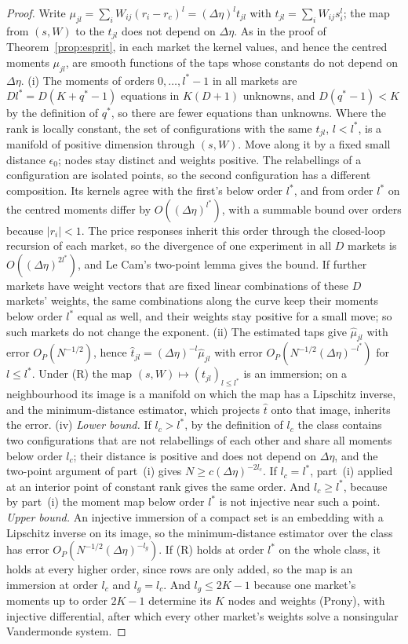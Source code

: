 \documentclass[12pt]{article}
\theoremstyle{definition}
\theoremstyle{remark}
\begin{document}
\begin{proof}
Write $\mu_{jl}=\sum_iW_{ij}(r_i-r_c)^l=(\Delta\eta)^lt_{jl}$ with $t_{jl}=\sum_iW_{ij}s_i^l$; the map from $(s,W)$ to the $t_{jl}$ does not depend on $\Delta\eta$. As in the proof of Theorem~\ref{prop:esprit}, in each market the kernel values, and hence the centred moments $\mu_{jl}$, are smooth functions of the taps whose constants do not depend on $\Delta\eta$.
(i) The moments of orders $0,\ldots,l^*-1$ in all markets are $Dl^*=D(K+q^*-1)$ equations in $K(D+1)$ unknowns, and $D(q^*-1)<K$ by the definition of $q^*$, so there are fewer equations than unknowns. Where the rank is locally constant, the set of configurations with the same $t_{jl}$, $l<l^*$, is a manifold of positive dimension through $(s,W)$. Move along it by a fixed small distance $\epsilon_0$; nodes stay distinct and weights positive. The relabellings of a configuration are isolated points, so the second configuration has a different composition. Its kernels agree with the first's below order $l^*$, and from order $l^*$ on the centred moments differ by $O((\Delta\eta)^{l^*})$, with a summable bound over orders because $|r_i|<1$. The price responses inherit this order through the closed-loop recursion of each market, so the divergence of one experiment in all $D$ markets is $O((\Delta\eta)^{2l^*})$, and Le Cam's two-point lemma gives the bound. If further markets have weight vectors that are fixed linear combinations of these $D$ markets' weights, the same combinations along the curve keep their moments below order $l^*$ equal as well, and their weights stay positive for a small move; so such markets do not change the exponent.
(ii) The estimated taps give $\hat\mu_{jl}$ with error $O_P(N^{-1/2})$, hence $\hat t_{jl}=(\Delta\eta)^{-l}\hat\mu_{jl}$ with error $O_P(N^{-1/2}(\Delta\eta)^{-l^*})$ for $l\le l^*$. Under (R) the map $(s,W)\mapsto(t_{jl})_{l\le l^*}$ is an immersion; on a neighbourhood its image is a manifold on which the map has a Lipschitz inverse, and the minimum-distance estimator, which projects $\hat t$ onto that image, inherits the error.
(iv) \emph{Lower bound.} If $l_c>l^*$, by the definition of $l_c$ the class contains two configurations that are not relabellings of each other and share all moments below order $l_c$; their distance is positive and does not depend on $\Delta\eta$, and the two-point argument of part~(i) gives $N\ge c(\Delta\eta)^{-2l_c}$. If $l_c=l^*$, part~(i) applied at an interior point of constant rank gives the same order. And $l_c\ge l^*$, because by part~(i) the moment map below order $l^*$ is not injective near such a point. \emph{Upper bound.} An injective immersion of a compact set is an embedding with a Lipschitz inverse on its image, so the minimum-distance estimator over the class has error $O_P(N^{-1/2}(\Delta\eta)^{-l_g})$. If (R) holds at order $l^*$ on the whole class, it holds at every higher order, since rows are only added, so the map is an immersion at order $l_c$ and $l_g=l_c$. And $l_g\le2K-1$ because one market's moments up to order $2K-1$ determine its $K$ nodes and weights (Prony), with injective differential, after which every other market's weights solve a nonsingular Vandermonde system.

\end{proof}
\end{document}
